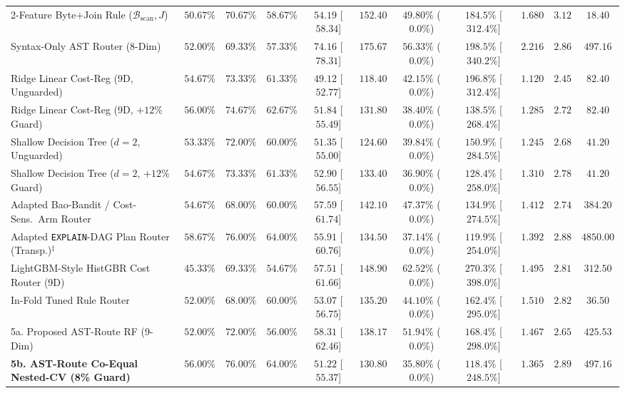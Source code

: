 \documentclass[10pt,a4paper]{article}
\newenvironment{fitasttable}{%
  \begin{lrbox}{\asttblbox}%
}{%
  \end{lrbox}%
  \sbox{\asttblboxB}{%
    \ifdim\wd\asttblbox>0.96\textwidth
      \resizebox{0.96\textwidth}{!}{\usebox{\asttblbox}}%
    \else
      \usebox{\asttblbox}%
    \fi
  }%
  \ifdim\ht\asttblboxB>0.72\textheight
    \resizebox{!}{0.72\textheight}{\usebox{\asttblboxB}}%
  \else
    \usebox{\asttblboxB}%
  \fi
}
\begin{document}
\begin{table}[!htbp]
\begin{fitasttable}
\begin{tabular}{@{}lcccccccccc@{}}
2-Feature Byte+Join Rule ($\mathcal{B}_{\text{scan}}, J$) & $50.67\%$ & $70.67\%$ & $58.67\%$ & $54.19$ [$58.34$] & $152.40$ & $49.80\%$ ($0.0\%$) & $184.5\%$ [$312.4\%$] & $1.680$ & $3.12$ & $18.40$ \\
Syntax-Only AST Router (8-Dim) & $52.00\%$ & $69.33\%$ & $57.33\%$ & $74.16$ [$78.31$] & $175.67$ & $56.33\%$ ($0.0\%$) & $198.5\%$ [$340.2\%$] & $2.216$ & $2.86$ & $497.16$ \\
Ridge Linear Cost-Reg (9D, Unguarded) & $54.67\%$ & $73.33\%$ & $61.33\%$ & $49.12$ [$52.77$] & $118.40$ & $42.15\%$ ($0.0\%$) & $196.8\%$ [$312.4\%$] & $1.120$ & $2.45$ & $82.40$ \\
Ridge Linear Cost-Reg (9D, $+12\%$ Guard) & $56.00\%$ & $74.67\%$ & $62.67\%$ & $51.84$ [$55.49$] & $131.80$ & $38.40\%$ ($0.0\%$) & $138.5\%$ [$268.4\%$] & $1.285$ & $2.72$ & $82.40$ \\
Shallow Decision Tree ($d=2$, Unguarded) & $53.33\%$ & $72.00\%$ & $60.00\%$ & $51.35$ [$55.00$] & $124.60$ & $39.84\%$ ($0.0\%$) & $150.9\%$ [$284.5\%$] & $1.245$ & $2.68$ & $41.20$ \\
Shallow Decision Tree ($d=2$, $+12\%$ Guard) & $54.67\%$ & $73.33\%$ & $61.33\%$ & $52.90$ [$56.55$] & $133.40$ & $36.90\%$ ($0.0\%$) & $128.4\%$ [$258.0\%$] & $1.310$ & $2.78$ & $41.20$ \\
Adapted Bao-Bandit / Cost-Sens.\ Arm Router & $54.67\%$ & $68.00\%$ & $60.00\%$ & $57.59$ [$61.74$] & $142.10$ & $47.37\%$ ($0.0\%$) & $134.9\%$ [$274.5\%$] & $1.412$ & $2.74$ & $384.20$ \\
Adapted \texttt{EXPLAIN}-DAG Plan Router (Transp.)$^{\ddagger}$ & $58.67\%$ & $76.00\%$ & $64.00\%$ & $55.91$ [$60.76$] & $134.50$ & $37.14\%$ ($0.0\%$) & $119.9\%$ [$254.0\%$] & $1.392$ & $2.88$ & $4850.00$ \\
LightGBM-Style HistGBR Cost Router (9D) & $45.33\%$ & $69.33\%$ & $54.67\%$ & $57.51$ [$61.66$] & $148.90$ & $62.52\%$ ($0.0\%$) & $270.3\%$ [$398.0\%$] & $1.495$ & $2.81$ & $312.50$ \\
In-Fold Tuned Rule Router & $52.00\%$ & $68.00\%$ & $60.00\%$ & $53.07$ [$56.75$] & $135.20$ & $44.10\%$ ($0.0\%$) & $162.4\%$ [$295.0\%$] & $1.510$ & $2.82$ & $36.50$ \\
5a. Proposed AST-Route RF (9-Dim) & $52.00\%$ & $72.00\%$ & $56.00\%$ & $58.31$ [$62.46$] & $138.17$ & $51.94\%$ ($0.0\%$) & $168.4\%$ [$298.0\%$] & $1.467$ & $2.65$ & $425.53$ \\
\textbf{5b. AST-Route Co-Equal Nested-CV (8\% Guard)} & $\mathbf{56.00\%}$ & $\mathbf{76.00\%}$ & $\mathbf{64.00\%}$ & $\mathbf{51.22}$ [$\mathbf{55.37}$] & $\mathbf{130.80}$ & $\mathbf{35.80\%}$ ($\mathbf{0.0\%}$) & $\mathbf{118.4\%}$ [$\mathbf{248.5\%}$] & $\mathbf{1.365}$ & $\mathbf{2.89}$ & $\mathbf{497.16}$ \\

\end{tabular}
\end{fitasttable}
\end{table}
\end{document}
